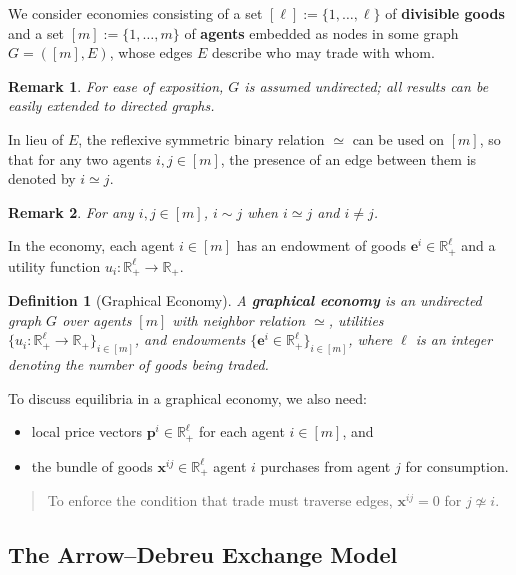 \documentclass[cm,linguex]{glossa}
\providecommand{\tightlist}{%
  \setlength{\itemsep}{0pt}\setlength{\parskip}{0pt}}
\theoremstyle{defn}
\newtheorem{defn}{Definition}
\theoremstyle{axiom}
\theoremstyle{thm}
\theoremstyle{lem}
\theoremstyle{cor}
\theoremstyle{prop}
\theoremstyle{rmk}
\newtheorem*{rmk}{Remark}
\begin{document}
We consider economies consisting of a set
\([\ell] := \{1, \dots, \ell\}\) of \textbf{divisible goods} and a set
\([m] := \{1, \dots, m\}\) of \textbf{agents} embedded as nodes in some
graph \(G = ([m], E)\), whose edges \(E\) describe who may trade with
whom.

\begin{rmk}
For ease of exposition, $G$ is assumed undirected; all results can be easily extended to directed graphs.
\end{rmk}

In lieu of \(E\), the reflexive symmetric binary relation \(\simeq\) can
be used on \([m]\), so that for any two agents \(i, j \in [m]\), the
presence of an edge between them is denoted by \(i \simeq j\).

\begin{rmk}
For any $i, j \in [m]$, $i \sim j$ when $i \simeq j$ and $i \neq j$.
\end{rmk}

In the economy, each agent \(i \in [m]\) has an endowment of goods
\(\mathbf{e}^i \in \mathbb{R}^\ell_+\) and a utility function
\(u_i : \mathbb{R}^\ell_+ \to \mathbb{R}_+\).

\begin{defn}[Graphical Economy]
A \textbf{graphical economy} is an undirected graph $G$ over agents $[m]$ with neighbor relation $\simeq$, utilities $\{u_i : \mathbb{R}^\ell_+ \to \mathbb{R}_+\}_{i \in [m]}$, and endowments $\{\mathbf{e}^i \in \mathbb{R}^\ell_+\}_{i \in [m]}$, where $\ell$ is an integer denoting the number of goods being traded.
\end{defn}

To discuss equilibria in a graphical economy, we also need:

\begin{itemize}
\tightlist
\item
  local price vectors \(\mathbf{p}^i \in \mathbb{R}^\ell_+\) for each
  agent \(i \in [m]\), and
\item
  the bundle of goods \(\mathbf{x}^{ij} \in \mathbb{R}^\ell_+\) agent
  \(i\) purchases from agent \(j\) for consumption.
\end{itemize}

\begin{quote}
To enforce the condition that trade must traverse edges,
\(\mathbf{x}^{ij} = 0\) for \(j \not\simeq i\).
\end{quote}

\hypertarget{the-arrowdebreu-exchange-model}{%
\subsection{The Arrow--Debreu Exchange
Model}\label{the-arrowdebreu-exchange-model}}
\end{document}
